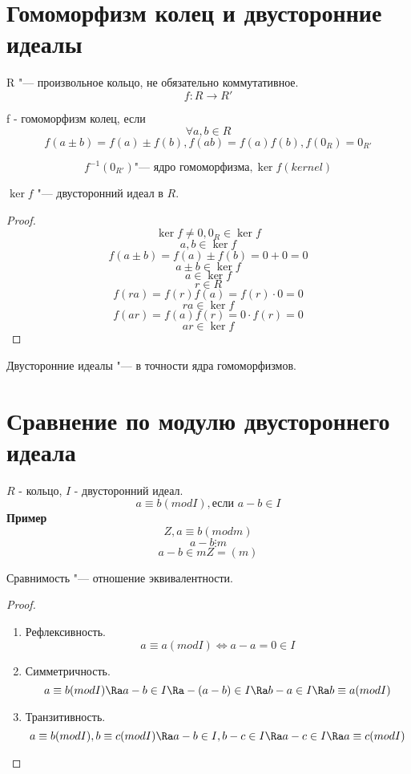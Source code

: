 \section{Гомоморфизм колец и двусторонние идеалы}
R "--- произвольное кольцо, не обязательно коммутативное.
$$f: R \to R'$$
\begin{Def}
f - гомоморфизм колец, если
$$\forall a, b \in R$$
$$f(a±b) = f(a) ± f(b), f(ab) = f(a) f(b), f(0_R) = 0_{R'}$$
\end{Def}
\begin{Def}
$$f^{-1}(0_{R'}) \text{"--- ядро гомоморфизма}, \ker f (kernel)$$
\end{Def}
\begin{theorem}
$\ker f$ "--- двусторонний идеал в $R$.
\end{theorem}
\begin{proof}
$$\ker f \ne 0, 0_R \in \ker f$$
$$a, b \in \ker f$$
$$f(a ± b) = f(a) ± f(b) = 0 + 0 = 0$$
$$a ± b \in \ker f$$
$$a \in \ker f$$
$$r \in R$$
$$f(ra) = f(r)f(a) = f(r) \cdot 0 = 0$$
$$ra \in \ker f$$
$$f(ar) = f(a)f(r) = 0 \cdot f(r) = 0$$
$$ar \in \ker f$$
\end{proof}
Двусторонние идеалы "--- в точности ядра гомоморфизмов.
\section{Сравнение по модулю двустороннего идеала}
$R$ - кольцо, $I$ - двусторонний идеал.
$$a \equiv b (mod I), \text{если } a - b \in I$$
\textbf{Пример}
$$Z, a \equiv b (mod m)$$
$$a - b \vdots m$$
$$a - b \in mZ = (m)$$
\begin{theorem}
Сравнимость "--- отношение эквивалентности.
\end{theorem}
\begin{proof}
\begin{enumerate}
\item Рефлексивность.
$$a \equiv a (mod I) \Leftrightarrow a - a = 0 \in I$$
\item Симметричность.
$$a \equiv b (mod I) \Ra a - b \in I \Ra -(a-b) \in I \Ra b - a \in I \Ra b \equiv a (mod I)$$
\item Транзитивность.
$$a \equiv b (mod I), b \equiv c (mod I) \Ra a - b \in I, b - c \in I \Ra a - c \in I \Ra a \equiv c (mod I)$$
\end{enumerate}
\end{proof}



